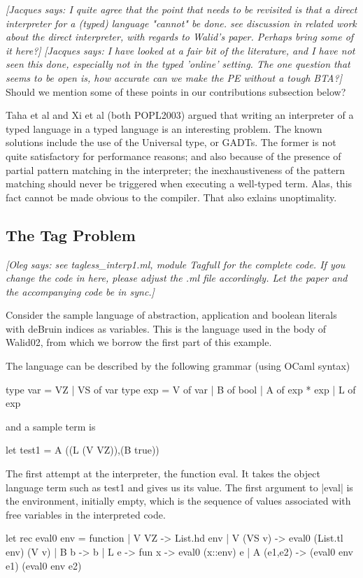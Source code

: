 \documentclass[preprint]{sigplanconf}
\newcommand{\jacques}[1]{{\it [Jacques says: #1]}}
\newcommand{\oleg}[1]{{\it [Oleg says: #1]}}
\begin{document}
\jacques{I quite agree that the point that needs to be revisited is
  that a \emph{direct} interpreter for a (typed) language "cannot" be
  done. see discussion in related work about the direct interpreter,
  with regards to Walid's paper. Perhaps bring some of it here?}
\jacques{I have looked at a fair bit of the literature, and I have not
  seen this done, especially not in the typed 'online' setting.  The
  one question that seems to be open is, how accurate can we make the
  PE without a tough BTA?}
Should we mention some of these points in our contributions subsection
below?

        Taha et al and Xi et al (both POPL2003) argued that writing an
interpreter of a typed language in a typed language is an interesting
problem. The known solutions include the use of the Universal type, or
GADTs. The former is not quite satisfactory for performance reasons;
and also because of the presence of partial pattern matching in the
interpreter; the inexhaustiveness of the pattern matching should never
be triggered when executing a well-typed term. Alas, this fact cannot
be made obvious to the compiler. That also exlains unoptimality.


\subsection{The Tag Problem}

\oleg{see tagless\_interp1.ml, module Tagfull for the complete code.
  If you change the code in here, please adjust the .ml file
  accordingly. Let the paper and the accompanying code be in sync.}


Consider the sample language of abstraction, application and boolean
literals with deBruin indices as variables. This is the language used
in the body of Walid02, from which we borrow the first part of 
this example.

The language can be described by the following grammar (using OCaml
syntax)


\begin{code}
  type var = VZ | VS of var
  type exp = V of var | B of bool | A of exp * exp | L of exp
\end{code}

and a sample term is
\begin{code}
  let test1 = A ((L (V VZ)),(B true))
\end{code}

The first attempt at the interpreter, the function eval. It takes the
object language term such as test1 and gives us its value.
The first argument to |eval| is the environment, initially empty,
which is the sequence of values associated with free variables in the
interpreted code.
\begin{code}
  let rec eval0 env = function 
  | V VZ -> List.hd env
  | V (VS v) -> eval0 (List.tl env) (V v)
  | B b -> b 
  | L e -> fun x -> eval0 (x::env) e
  | A (e1,e2) -> (eval0 env e1) (eval0 env e2) 
\end{code}
\end{document}
